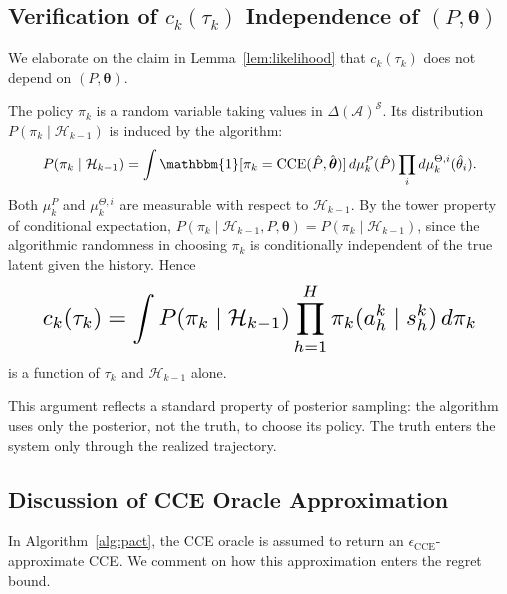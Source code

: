 \subsection{Verification of \texorpdfstring{$c_k(\tau_k)$}{c\_k(tau\_k)} Independence of \texorpdfstring{$(P, \boldsymbol{\theta})$}{(P, theta)}}
\label{app:ck}

We elaborate on the claim in Lemma~\ref{lem:likelihood} that $c_k(\tau_k)$ does not depend on $(P, \boldsymbol{\theta})$.

The policy $\pi_k$ is a random variable taking values in $\Delta(\mathcal{A})^{\mathcal{S}}$. Its distribution $P(\pi_k \mid \mathcal{H}_{k-1})$ is induced by the algorithm:
\begin{equation}\resizebox{0.9\linewidth}{!}{$\displaystyle P(\pi_k \mid \mathcal{H}_{k-1}) = \int \mathbbm{1}[\pi_k = \mathrm{CCE}(\hat{P}, \hat{\boldsymbol{\theta}})] \, d\mu_k^P(\hat{P}) \prod_i d\mu_k^{\Theta,i}(\hat{\theta}_i). $}\end{equation}
Both $\mu_k^P$ and $\mu_k^{\Theta,i}$ are measurable with respect to $\mathcal{H}_{k-1}$. By the tower property of conditional expectation, $P(\pi_k \mid \mathcal{H}_{k-1}, P, \boldsymbol{\theta}) = P(\pi_k \mid \mathcal{H}_{k-1})$, since the algorithmic randomness in choosing $\pi_k$ is conditionally independent of the true latent given the history. Hence
\begin{equation}\resizebox{0.9\linewidth}{!}{$\displaystyle c_k(\tau_k) = \int P(\pi_k \mid \mathcal{H}_{k-1}) \prod_{h=1}^H \pi_k(a_h^k \mid s_h^k) \, d\pi_k $}\end{equation}
is a function of $\tau_k$ and $\mathcal{H}_{k-1}$ alone.

This argument reflects a standard property of posterior sampling: the algorithm uses only the posterior, not the truth, to choose its policy. The truth enters the system only through the realized trajectory.

\subsection{Discussion of CCE Oracle Approximation}
\label{app:cce}

In Algorithm~\ref{alg:pact}, the CCE oracle is assumed to return an $\epsilon_{\mathrm{CCE}}$-approximate CCE. We comment on how this approximation enters the regret bound.

